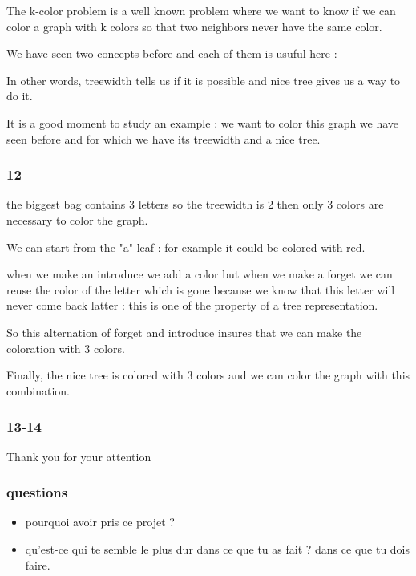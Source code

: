 \documentclass[a4paper, 10pt,french,landscape]{article}
\begin{document}
\begin{multicols}{3}
The k-color problem is a well known problem where we want to know if we can color a graph with k colors so that two neighbors never have the same color.

We have seen two concepts before and each of them is usuful here : 


In other words, treewidth tells us if it is possible and nice tree gives us a way to do it.

It is a good moment to study an example : we want to color this graph we have seen before and for which we have its treewidth and a nice tree.


\subsubsection*{ 12}



the biggest bag contains 3 letters so the treewidth is 2 then only 3 colors are necessary to color the graph.

We can start from the "a" leaf : for example it could be colored with red.

when we make an introduce we add a color but when we make a forget we can reuse the color of the letter which is gone because we know that this letter will never come back latter : this is one of the property of a tree representation.

So this alternation of forget and introduce insures that we can make the coloration with 3 colors.


Finally, the nice tree is colored with 3 colors and we can color the graph with this combination.



\subsubsection*{ 13-14}





Thank you for your attention

\subsubsection*{questions}
\begin{itemize}
\item pourquoi avoir pris ce projet ?
\item qu'est-ce qui te semble le plus dur dans ce que tu as fait ? dans ce que tu dois faire.
\end{itemize}

\end{multicols}
\end{document}

